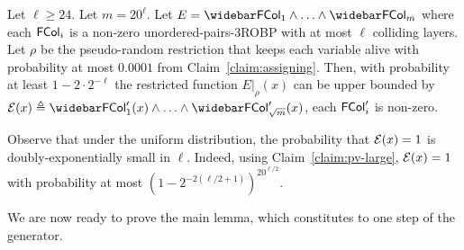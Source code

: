 {\begin{lemma}\label{lemma:error under restriction}
Let $\ell \ge 24$.
	Let $m= 20^{\ell}$. Let $E = \bar{\FCol_1} \wedge \ldots \wedge \bar{\FCol_m}$ where each ${\mathsf{FCol}}_i$ is a non-zero unordered-pairs-3ROBP with at most $\ell$ colliding layers.
	Let $\rho$ be the pseudo-random restriction that keeps each variable alive with probability at most $0.0001$ from 
	Claim~\ref{claim:assigning}.
	Then, with probability at least $1-2\cdot 2^{-\ell}$ the restricted function $E|_{\rho}(x)$ can be upper bounded by 
	$\mE(x) \triangleq \bar{\FCol'_{1}(x)} \wedge\ldots \wedge \bar{\FCol'_{\sqrt{m}}(x)}$, each ${\mathsf{FCol}}'_i$ is non-zero.
\end{lemma}
Observe that under the uniform distribution, the probability that ${\mathcal{E}}(x)=1$ is doubly-exponentially small in $\ell$. Indeed, using  Claim~\ref{claim:pv-large}, ${\mathcal{E}}(x)=1$ with probability at most $(1-2^{-2(\ell/2+1)})^{20^{\ell/2}}$.

	
	
We are now ready to prove the main lemma, which constitutes to one step of the generator.

}

